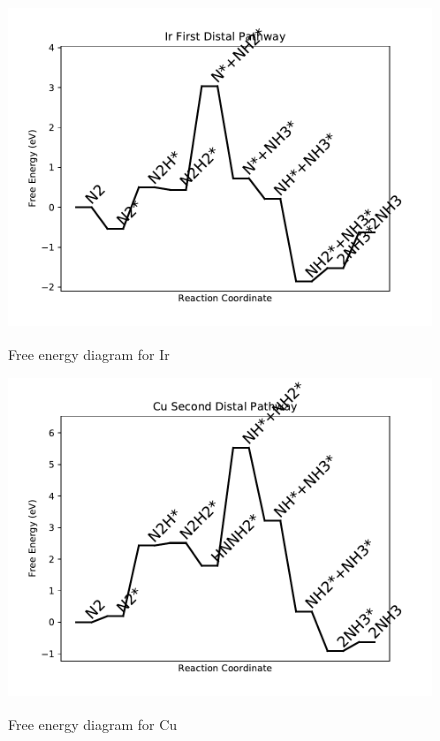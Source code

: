 \documentclass{article}
\begin{document}
\begin{figure}
\includegraphics[width=1\linewidth]{data/plots/Ir_distal_1.pdf}
\label{fig:Ir_distal_1}
\caption{Free energy diagram for Ir}
\end{figure}

\clearpage
\begin{figure}
\includegraphics[width=1\linewidth]{data/plots/Cu_distal_2.pdf}
\label{fig:Cu_distal_2}
\caption{Free energy diagram for Cu}
\end{figure}
\end{document}

